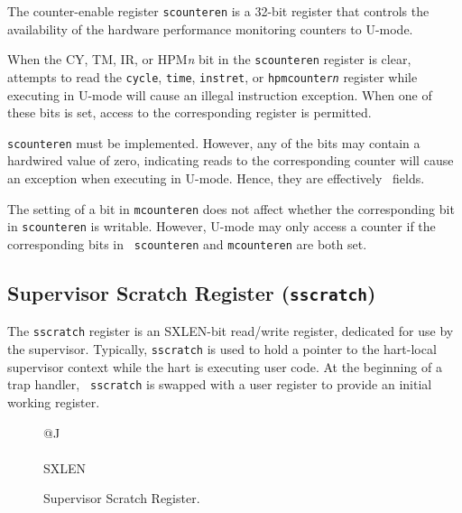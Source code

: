 The counter-enable register {\tt scounteren} is a 32-bit register that
controls the availability of the hardware performance monitoring counters to
U-mode.

When the CY, TM, IR, or HPM{\em n} bit in the {\tt scounteren} register is
clear, attempts to read the {\tt cycle}, {\tt time}, {\tt instret}, or
{\tt hpmcounter{\em n}} register while executing in U-mode
will cause an illegal instruction exception.  When one of these bits is set,
access to the corresponding register is permitted.

{\tt scounteren} must be implemented.  However, any of the bits may contain
a hardwired value of zero, indicating reads to the corresponding counter will
cause an exception when executing in U-mode.
Hence, they are effectively \warl\ fields.

\begin{commentary}
The setting of a bit in {\tt mcounteren} does not affect whether the
corresponding bit in {\tt scounteren} is writable.
However, U-mode may only access a counter if the corresponding bits in {\tt
scounteren} and {\tt mcounteren} are both set.
\end{commentary}

\subsection{Supervisor Scratch Register ({\tt sscratch})}

The {\tt sscratch} register is an SXLEN-bit read/write register,
dedicated for use by the supervisor.  Typically, {\tt sscratch} is
used to hold a pointer to the hart-local supervisor context while the
hart is executing user code.  At the beginning of a trap handler, {\tt
  sscratch} is swapped with a user register to provide an initial
working register.

\begin{figure}[h!]
{\footnotesize
\begin{center}
\begin{tabular}{@{}J}
 \\
\hline
{} \\
\hline
SXLEN \\
\end{tabular}
\end{center}
}
\vspace{-0.1in}
\caption{Supervisor Scratch Register.}
\label{kregs}
\end{figure}

